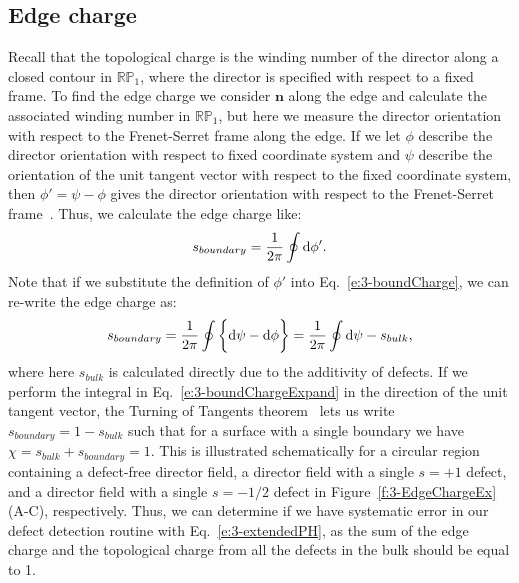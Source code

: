 \subsection{Edge charge}
Recall that the topological charge is the winding number of the director along a closed contour in $\mathbb{R}\mathbb{P}_1$, where the director is specified with respect to a fixed frame.
To find the edge charge we consider $\mathbf{n}$ along the edge and calculate the associated winding number in $\mathbb{R}\mathbb{P}_1$, but here we measure the director orientation with respect to the Frenet-Serret frame along the edge.
If we let $\phi$ describe the director orientation with respect to fixed coordinate system and $\psi$ describe the orientation of the unit tangent vector with respect to the fixed coordinate system, then $\phi' = \psi-\phi$ gives the director orientation with respect to the Frenet-Serret frame~\cite{RN35,RN23}.
Thus, we calculate the edge charge like:
\begin{equation}
  s_{boundary} = \frac{1}{2\pi} \oint \textup{d}\phi'\label{e:3-boundCharge}.
\end{equation}
Note that if we substitute the definition of $\phi'$ into Eq.~\ref{e:3-boundCharge}, we can re-write the edge charge as:
\begin{equation}
  s_{boundary} = \frac{1}{2\pi} \oint \bigg \{ \textup{d}\psi - \textup{d}\phi \bigg \} = \frac{1}{2\pi} \oint \textup{d}\psi - s_{bulk}\label{e:3-boundChargeExpand},
\end{equation}
where here $s_{bulk}$ is calculated directly due to the additivity of defects.
If we perform the integral in Eq.~\ref{e:3-boundChargeExpand} in the direction of the unit tangent vector, the Turning of Tangents theorem~\cite{RN35} lets us write $s_{boundary} = 1 - s_{bulk}$ such that for a surface with a single boundary we have $\chi = s_{bulk} + s_{boundary} = 1$.
This is illustrated schematically for a circular region containing a defect-free director field, a director field with a single $s = +1$ defect, and a director field with a single $s=-1/2$ defect in Figure~\ref{f:3-EdgeChargeEx}(A-C), respectively.
Thus, we can determine if we have systematic error in our defect detection routine with Eq.~\ref{e:3-extendedPH}, as the sum of the edge charge and the topological charge from all the defects in the bulk should be equal to 1.
